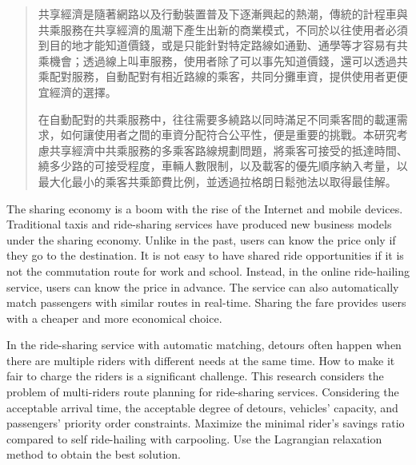 
\begin{abstract}

共享經濟是隨著網路以及行動裝置普及下逐漸興起的熱潮，傳統的計程車與共乘服務在共享經濟的風潮下產生出新的商業模式，不同於以往使用者必須到目的地才能知道價錢，或是只能針對特定路線如通勤、通學等才容易有共乘機會；透過線上叫車服務，使用者除了可以事先知道價錢，還可以透過共乘配對服務，自動配對有相近路線的乘客，共同分攤車資，提供使用者更便宜經濟的選擇。

在自動配對的共乘服務中，往往需要多繞路以同時滿足不同乘客間的載運需求，如何讓使用者之間的車資分配符合公平性，便是重要的挑戰。本研究考慮共享經濟中共乘服務的多乘客路線規劃問題，將乘客可接受的抵達時間、繞多少路的可接受程度，車輛人數限制，以及載客的優先順序納入考量，以最大化最小的乘客共乘節費比例，並透過拉格朗日鬆弛法以取得最佳解。

\end{abstract}

\begin{abstract*}
  The sharing economy is a boom with the rise of the Internet and mobile devices. Traditional taxis and ride-sharing services have produced new business models under the sharing economy. Unlike in the past, users can know the price only if they go to the destination. It is not easy to have shared ride opportunities if it is not the commutation route for work and school. Instead, in the online ride-hailing service, users can know the price in advance. The service can also automatically match passengers with similar routes in real-time. Sharing the fare provides users with a cheaper and more economical choice.
  
  In the ride-sharing service with automatic matching, detours often happen when there are multiple riders with different needs at the same time. How to make it fair to charge the riders is a significant challenge. This research considers the problem of multi-riders route planning for ride-sharing services. Considering the acceptable arrival time, the acceptable degree of detours, vehicles' capacity, and passengers' priority order constraints. Maximize the minimal rider's savings ratio compared to self ride-hailing with carpooling. Use the Lagrangian relaxation method to obtain the best solution.
\end{abstract*}
